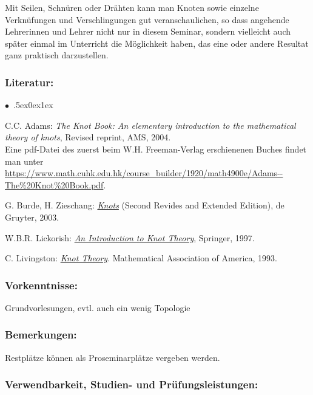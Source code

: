 \documentclass[a4paper,10pt]{article}
\renewenvironment{itemize}{\begin{list}{$\bullet$\ }{\itemsep.5ex\setlength{\topsep}{0.5\itemsep}\parsep0ex\labelsep1ex\settowidth{\labelwidth}{$\bullet$\ }\setlength{\leftmargin}{\labelwidth}\addtolength{\leftmargin}{3ex}\addtolength{\leftmargin}{\labelsep}}}{\end{list}}
\begin{document}
Mit Seilen, Schnüren oder Drähten kann man Knoten sowie einzelne Verknüfungen und Verschlingungen gut veranschaulichen, so dass angehende Lehrerinnen und Lehrer nicht nur in diesem Seminar, sondern vielleicht auch später einmal im Unterricht die Möglichkeit haben, das eine oder andere Resultat ganz praktisch darzustellen.
\subsubsection*{\large
    Literatur:
}
\begin{itemize} 
\item C.C. Adams: \textit{The Knot Book: An elementary introduction to the mathematical theory of knots}, Revised reprint, AMS, 2004.\\
Eine pdf-Datei des zuerst beim W.H. Freeman-Verlag erschienenen Buches findet man unter \url{https://www.math.cuhk.edu.hk/course\_builder/1920/math4900e/Adams--The\%20Knot\%20Book.pdf}.            
\item G. Burde, H. Zieschang: \href{https://www.maths.ed.ac.uk/~v1ranick/papers/burdzies.pdf}{\textit{Knots}} (Second Revides and Extended Edition), de Gruyter, 2003.
\item W.B.R. Lickorish: \href{http://www.redi-bw.de/start/unifr/EBooks-springer/10.1007/978-1-4612-0691-0}{\textit{An Introduction to Knot Theory}}, Springer, 1997.
\item C. Livingston: \href{https://www.math.cuhk.edu.hk/course\_builder/1920/math4900e/Livingston\%20C.---Knot\%20theory\%20(MAA,\%201996).pdf}{\textit{Knot Theory}}. Mathematical Association of America, 1993.
\end{itemize}
\subsubsection*{\large
    Vorkenntnisse:
}
Grundvorlesungen, evtl. auch ein wenig Topologie
\subsubsection*{\large
    Bemerkungen:
}
Restplätze können als Proseminarplätze vergeben werden.
\cleardoublepage
\subsubsection*{\large
    Verwendbarkeit, Studien- und Prüfungsleistungen:
}
\end{document}
